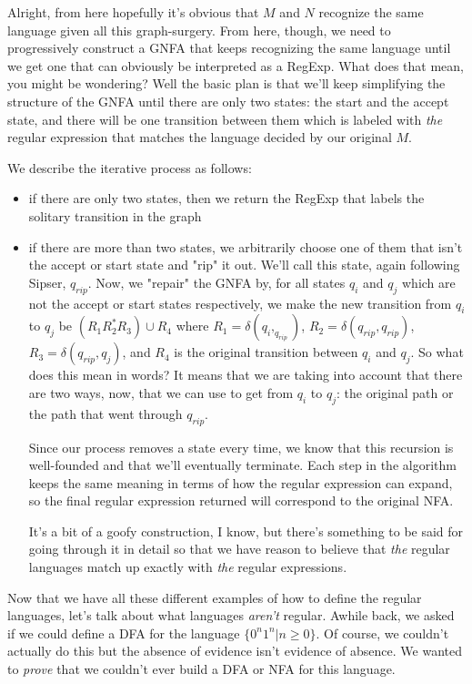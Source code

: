 \documentclass[11pt]{article}
\begin{document}
Alright, from here hopefully it's obvious that $M$ and $N$ recognize the same language given all this graph-surgery. From here, though, we need to progressively construct a GNFA that keeps recognizing the same language until we get one that can obviously be interpreted as a RegExp. What does that mean, you might be wondering? Well the basic plan is that we'll keep simplifying the structure of the GNFA until there are only two states: the start and the accept state, and there will be one transition between them which is labeled with \emph{the} regular expression that matches the language decided by our original $M$.

We describe the iterative process as follows: 

\begin{itemize}
\item if there are only two states, then we return the RegExp that labels the solitary transition in the graph
\item if there are more than two states, we arbitrarily choose one of them that isn't the accept or start state and "rip" it out. We'll call this state, again following Sipser, $q_{rip}$. Now, we "repair" the GNFA by, for all states $q_i$ and $q_j$ which are not the accept or start states respectively, we make the new transition from $q_i$ to $q_j$ be $(R_1 R_2^* R_3) \cup R_4$ where $R_1 = \delta(q_i,_q_{rip})$, $R_2 = \delta(q_{rip},q_{rip})$, $R_3 = \delta(q_{rip},q_j)$, and $R_4$ is the original transition between $q_i$ and $q_j$. So what does this mean in words? It means that we are taking into account that there are two ways, now, that we can use to get from $q_i$ to $q_j$: the original path or the path that went through $q_{rip}$. 

Since our process removes a state every time, we know that this recursion is well-founded and that we'll eventually terminate. Each step in the algorithm keeps the same meaning in terms of how the regular expression can expand, so the final regular expression returned will correspond to the original NFA.

It's a bit of a goofy construction, I know, but there's something to be said for going through it in detail so that we have reason to believe that \emph{the} regular languages match up exactly with \emph{the} regular expressions.
\end{itemize}

Now that we have all these different examples of how to define the regular languages, let's talk about what languages \emph{aren't} regular. Awhile back, we asked if we could define a DFA for the language $\{0^n1^n | n \geq 0\}$. Of course, we couldn't actually do this but the absence of evidence isn't evidence of absence. We wanted to \emph{prove} that we couldn't ever build a DFA or NFA for this language.
\end{document}
